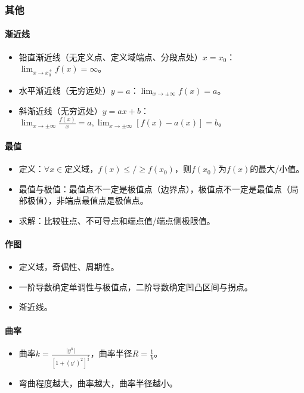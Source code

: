 \documentclass[
12pt, %
a4paper, 
oneside, %
headinclude,footinclude, %
]{scrartcl}
\begin{document}
\subsubsection[其他]{其他}
\paragraph{渐近线}
\begin{itemize}
\item 铅直渐近线（无定义点、定义域端点、分段点处）$ x = x_0 $：$ \lim_{x \to x_0^{\pm}} f(x) = \infty $。
\item 水平渐近线（无穷远处）$ y = a $：$ \lim_{x \to \pm \infty} f(x) = a $。
\item 斜渐近线（无穷远处）$ y = ax + b $：$ \lim_{x \to \pm \infty} \frac{f(x)}{x} = a, \lim_{x \to \pm \infty} [f(x) - a(x)] = b $。
\end{itemize}
\paragraph{最值}
\begin{itemize}
\item 定义：$ \forall x \in $定义域，$ f(x) \leq / \geq f(x_0) $，则$ f(x_0) $为$ f(x) $的最大/小值。
\item 最值与极值：最值点不一定是极值点（边界点），极值点不一定是最值点（局部极值），非端点最值点是极值点。
\item 求解：比较驻点、不可导点和端点值/端点侧极限值。
\end{itemize}
\paragraph{作图}
\begin{itemize}
\item 定义域，奇偶性、周期性。
\item 一阶导数确定单调性与极值点，二阶导数确定凹凸区间与拐点。
\item 渐近线。
\end{itemize}
\paragraph{曲率}
\begin{itemize}
\item 曲率$ k = \frac{|y^n|}{[1 + (y')^2]^{\frac{3}{2}}} $，曲率半径$ R = \frac{1}{k} $。
\item 弯曲程度越大，曲率越大，曲率半径越小。
\end{itemize}
\end{document}
